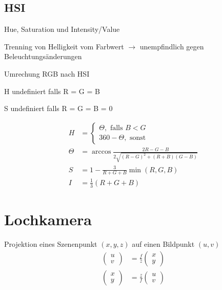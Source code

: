 \subsection{HSI}
\begin{compactitem}
    \item Hue, Saturation und Intensity/Value
    \item Trenning von Helligkeit vom Farbwert $\rightarrow$ unempfindlich gegen
    Beleuchtungsänderungen
    \item Umrechung RGB nach HSI
    \begin{compactitem}
        \item H undefiniert falls R = G = B
        \item S undefiniert falls R = G = B = 0
    \end{compactitem}
\end{compactitem}
\begin{align}
    H &= \begin{cases} \Theta, \text{ falls } B < G \\ 360 - \Theta, \text{ sonst}
        \end{cases} \\
    \Theta &= \arccos\frac{2R-G-B}{2\sqrt{(R-G)^2 + (R+B)(G-B)}} \\
    S &= 1 - \frac{3}{R + G + B}\min(R,G,B) \\
    I &= \frac{1}{3}(R+G+B)
\end{align}

\section{Lochkamera}
Projektion eines Szenenpunkt $(x,y,z)$ auf einen Bildpunkt $(u,v)$
\begin{align}
    \begin{pmatrix}u \\ v \end{pmatrix} &= \frac{f}{z} \begin{pmatrix} x \\ y \end{pmatrix} \\
    \begin{pmatrix}x \\ y \end{pmatrix} &= \frac{z}{f} \begin{pmatrix}u \\ v \end{pmatrix}
\end{align}

